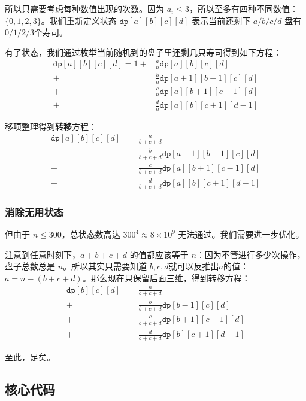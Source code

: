 所以只需要考虑每种数值出现的次数。因为 $a_i \le 3$，所以至多有四种不同数值：$\{0,1,2,3\}$。我们重新定义状态 ${\texttt{dp}[a][b][c][d]}$ 表示当前还剩下
$a/b/c/d$ 盘有$0/1/2/3$个寿司。

有了状态，我们通过枚举当前随机到的盘子里还剩几只寿司得到如下方程：
\begin{align*}
{\texttt{dp}[a][b][c][d]}
= 1
+&\frac{a}{n} {\texttt{dp}[a][b][c][d]}\\
+&\frac{b}{n} {\texttt{dp}[a+1][b-1][c][d]} \\
+&\frac{c}{n} {\texttt{dp}[a][b+1][c-1][d]} \\
+&\frac{d}{n} {\texttt{dp}[a][b][c+1][d-1]} 
\end{align*}

移项整理得到\textbf{转移}方程：
\begin{align*}
{\texttt{dp}[a][b][c][d]}
= &\frac{n}{b+c+d}\\
+&\frac{b}{b+c+d} {\texttt{dp}[a+1][b-1][c][d]} \\
+&\frac{c}{b+c+d} {\texttt{dp}[a][b+1][c-1][d]} \\
+&\frac{d}{b+c+d} {\texttt{dp}[a][b][c+1][d-1]} 
\end{align*}

\subsubsection*{消除无用状态}
但由于 $n\le 300$，总状态数高达 $300^4 \approx 8\times 10^9$ 无法通过。我们需要进一步优化。

注意到任意时刻下，$a+b+c+d$ 的值都应该等于 $n$：因为不管进行多少次操作，盘子总数总是 $n$。所以其实只需要知道 $b,c,d$就可以反推出$a$的值：$a = n-(b+c+d)$。那么现在只保留后面三维，得到转移方程：
\begin{align*}
{\texttt{dp}[b][c][d]} 
= &\frac{n}{b+c+d}\\
+&\frac{b}{b+c+d} {\texttt{dp}[b-1][c][d]} \\
+&\frac{c}{b+c+d} {\texttt{dp}[b+1][c-1][d]} \\
+&\frac{d}{b+c+d} {\texttt{dp}[b][c+1][d-1]} 
\end{align*}

至此，足矣。

\newpage
\subsection*{核心代码}
\inputminted[linenos,autogobble]{cpp}{./Code/J.cpp}
\newpage